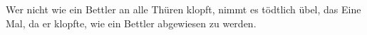 Wer nicht wie ein Bettler an alle Thüren klopft, nimmt es tödtlich übel, das Eine Mal, da er klopfte, wie ein Bettler abgewiesen zu werden.
\par

